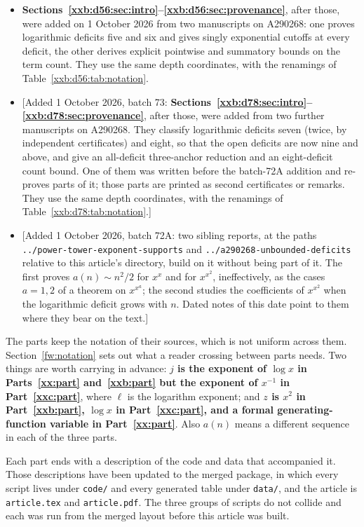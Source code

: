 \documentclass[11pt,a4paper]{article}
\numberwithin{equation}{section}
\theoremstyle{definition}
\theoremstyle{remark}
\theoremstyle{plain}
\newcommand{\sibPTE}{\texttt{power-\allowbreak{}tower-\allowbreak{}exponent-\allowbreak{}supports}}
\newcommand{\sibAUD}{\texttt{a290268-\allowbreak{}unbounded-\allowbreak{}deficits}}
\begin{document}
\begin{itemize}[leftmargin=1.6em,itemsep=2pt]
\item \textbf{Sections~\ref{xxb:d56:sec:intro}--\ref{xxb:d56:sec:provenance}},
 after those, were added on 1 October 2026 from two manuscripts on A290268:
 one proves logarithmic deficits five and six and gives singly exponential
 cutoffs at every deficit, the other derives explicit pointwise and
 summatory bounds on the term count.  They use the same depth coordinates,
 with the renamings of Table~\ref{xxb:d56:tab:notation}.
\item {}[Added 1 October 2026, batch 73: \textbf{Sections~\ref{xxb:d78:sec:intro}--\ref{xxb:d78:sec:provenance}},
 after those, were added from two further manuscripts on A290268.  They
 classify logarithmic deficits seven (twice, by independent certificates) and
 eight, so that the open deficits are now nine and above, and give an
 all-deficit three-anchor reduction and an eight-deficit count bound.  One of
 them was written before the batch-72A addition and re-proves parts of it;
 those parts are printed as second certificates or remarks.  They use the same
 depth coordinates, with the renamings of Table~\ref{xxb:d78:tab:notation}.]
\item {}[Added 1 October 2026, batch 72A: two sibling reports, at the paths
 \texttt{../}\sibPTE{} and \texttt{../}\sibAUD{} relative
 to this article's directory, build on it without being part of it.  The
 first proves $a(n)\sim n^2/2$ for $x^x$ and for $x^{x^2}$, ineffectively, as
 the cases $a=1,2$ of a theorem on $x^{x^a}$; the second studies the
 coefficients of $x^{x^2}$ when the logarithmic deficit grows with $n$.
 Dated notes of this date point to them where they bear on the text.]
\end{itemize}

The parts keep the notation of their sources, which is not uniform across them.
Section~\ref{fw:notation} sets out what a reader crossing between parts needs.
Two things are worth carrying in advance: \textbf{$j$ is the exponent of
$\log x$ in Parts~\ref{xx:part} and~\ref{xxb:part} but the exponent of $x^{-1}$
in Part~\ref{xxc:part}}, where $\ell$ is the logarithm exponent; and
\textbf{$z$ is $x^2$ in Part~\ref{xxb:part}, $\log x$ in Part~\ref{xxc:part},
and a formal generating-function variable in Part~\ref{xx:part}}.  Also
$a(n)$ means a different sequence in each of the three parts.

Each part ends with a description of the code and data that accompanied it.
Those descriptions have been updated to the merged package, in which every
script lives under \texttt{code/} and every generated table under
\texttt{data/}, and the article is \texttt{article.tex} and
\texttt{article.pdf}.  The three groups of scripts do not collide and each was
run from the merged layout before this article was built.
\end{document}
